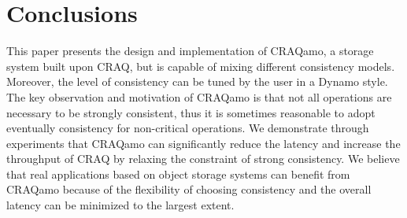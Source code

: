 \section{Conclusions}
This paper presents the design and implementation of CRAQamo, a storage system built upon CRAQ, but is capable of mixing different consistency models. Moreover, the level of consistency can be tuned by the user in a Dynamo style. The key observation and motivation of CRAQamo is that not all operations are necessary to be strongly consistent, thus it is sometimes reasonable to adopt eventually consistency for non-critical operations. We demonstrate through experiments that CRAQamo can significantly reduce the latency and increase the throughput of CRAQ by relaxing the constraint of strong consistency. We believe that real applications based on object storage systems can benefit from CRAQamo because of the flexibility of choosing consistency and the overall latency can be minimized to the largest extent.
\label{sec:conclusion}


